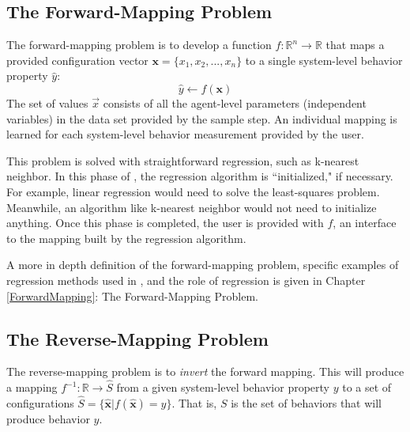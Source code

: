 \subsection{The Forward-Mapping Problem}


The forward-mapping problem is to develop a function $f: \mathbb{R}^n \rightarrow \mathbb{R}$ that maps a provided configuration vector $\mathbf x = \{x_1, x_2, ..., x_n \}$ to a single system-level behavior property $\hat y$:
\[\hat y \leftarrow f(\mathbf x)\]
The set of values $\vec x$ consists of all the agent-level parameters (independent variables) in the data set provided by the sample step.
An individual mapping is learned for each system-level behavior measurement provided by the user.

This problem is solved with straightforward regression, such as k-nearest neighbor.
In this phase of \fw, the regression algorithm is ``initialized," if necessary.
For example, linear regression would need to solve the least-squares problem.
Meanwhile, an algorithm like k-nearest neighbor would not need to initialize anything.
Once this phase is completed, the user is provided with $f$, an interface to the mapping built by the regression algorithm.

A more in depth definition of the forward-mapping problem, specific examples of regression methods used in \fw, and the role of regression is given in Chapter \ref{ForwardMapping}: The Forward-Mapping Problem.


\subsection{The Reverse-Mapping Problem}

The reverse-mapping problem is to \textit{invert} the forward mapping.
This will produce a mapping $ f^{-1}: \mathbb{R} \rightarrow \hat S$ from a given system-level behavior property $y$ to a set of
configurations $ \hat S = \{ \mathbf {\hat x} | f( \mathbf {\hat x}) = y \}$.
That is, $S$ is the set of behaviors that will produce behavior $y$.


